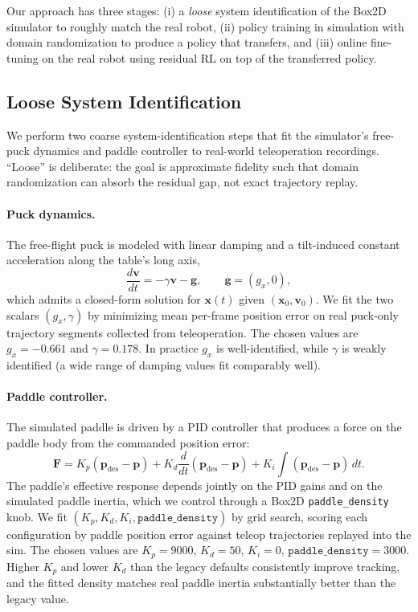 \documentclass{article}
\begin{document}
    Our approach has three stages: (i) a \emph{loose} system identification of the Box2D simulator to roughly match the real robot, (ii) policy training in simulation with domain randomization to produce a policy that transfers, and (iii) online fine-tuning on the real robot using residual RL on top of the transferred policy.

\subsection{Loose System Identification}
\label{sec:method:sysid}

    We perform two coarse system-identification steps that fit the simulator's free-puck dynamics and paddle controller to real-world teleoperation recordings. ``Loose'' is deliberate: the goal is approximate fidelity such that domain randomization can absorb the residual gap, not exact trajectory replay.

    \paragraph{Puck dynamics.} The free-flight puck is modeled with linear damping and a tilt-induced constant acceleration along the table's long axis,
    \begin{equation}
        \frac{d\mathbf{v}}{dt} = -\gamma \mathbf{v} - \mathbf{g}, \qquad \mathbf{g} = (g_x, 0),
        \label{eq:puck-model}
    \end{equation}
    which admits a closed-form solution for $\mathbf{x}(t)$ given $(\mathbf{x}_0, \mathbf{v}_0)$. We fit the two scalars $(g_x, \gamma)$ by minimizing mean per-frame position error on real puck-only trajectory segments collected from teleoperation. The chosen values are $g_x = -0.661$ and $\gamma = 0.178$. In practice $g_x$ is well-identified, while $\gamma$ is weakly identified (a wide range of damping values fit comparably well).

    \paragraph{Paddle controller.} The simulated paddle is driven by a PID controller that produces a force on the paddle body from the commanded position error:
    \begin{equation}
        \mathbf{F} = K_p (\mathbf{p}_{\text{des}} - \mathbf{p}) + K_d \frac{d}{dt}(\mathbf{p}_{\text{des}} - \mathbf{p}) + K_i \int (\mathbf{p}_{\text{des}} - \mathbf{p})\, dt.
        \label{eq:pid}
    \end{equation}
    The paddle's effective response depends jointly on the PID gains and on the simulated paddle inertia, which we control through a Box2D \texttt{paddle\_density} knob. We fit $(K_p, K_d, K_i, \texttt{paddle\_density})$ by grid search, scoring each configuration by paddle position error against teleop trajectories replayed into the sim. The chosen values are $K_p = 9000$, $K_d = 50$, $K_i = 0$, $\texttt{paddle\_density} = 3000$. Higher $K_p$ and lower $K_d$ than the legacy defaults consistently improve tracking, and the fitted density matches real paddle inertia substantially better than the legacy value.
\end{document}
